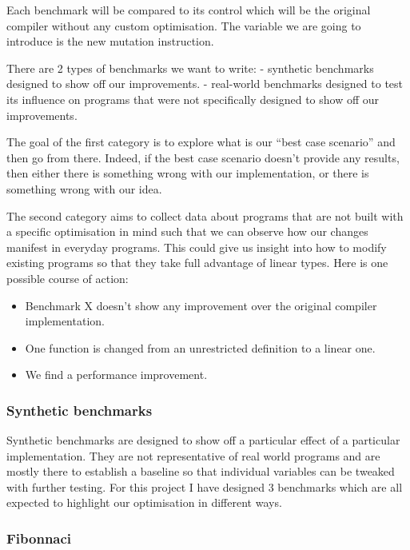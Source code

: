 \documentclass[
]{article}
\providecommand{\tightlist}{%
  \setlength{\itemsep}{0pt}\setlength{\parskip}{0pt}}
\begin{document}
Each benchmark will be compared to its control which will be the
original compiler without any custom optimisation. The variable we are
going to introduce is the new mutation instruction.

There are 2 types of benchmarks we want to write: - synthetic benchmarks
designed to show off our improvements. - real-world benchmarks designed
to test its influence on programs that were not specifically designed to
show off our improvements.

The goal of the first category is to explore what is our ``best case
scenario'' and then go from there. Indeed, if the best case scenario
doesn't provide any results, then either there is something wrong with
our implementation, or there is something wrong with our idea.

The second category aims to collect data about programs that are not
built with a specific optimisation in mind such that we can observe how
our changes manifest in everyday programs. This could give us insight
into how to modify existing programs so that they take full advantage of
linear types. Here is one possible course of action:

\begin{itemize}
\tightlist
\item
  Benchmark X doesn't show any improvement over the original compiler
  implementation.
\item
  One function is changed from an unrestricted definition to a linear
  one.
\item
  We find a performance improvement.
\end{itemize}

\hypertarget{synthetic-benchmarks}{%
\subsubsection{Synthetic benchmarks}\label{synthetic-benchmarks}}

Synthetic benchmarks are designed to show off a particular effect of a
particular implementation. They are not representative of real world
programs and are mostly there to establish a baseline so that individual
variables can be tweaked with further testing. For this project I have
designed 3 benchmarks which are all expected to highlight our
optimisation in different ways.

\hypertarget{fibonnaci}{%
\subsubsection{Fibonnaci}\label{fibonnaci}}
\end{document}
